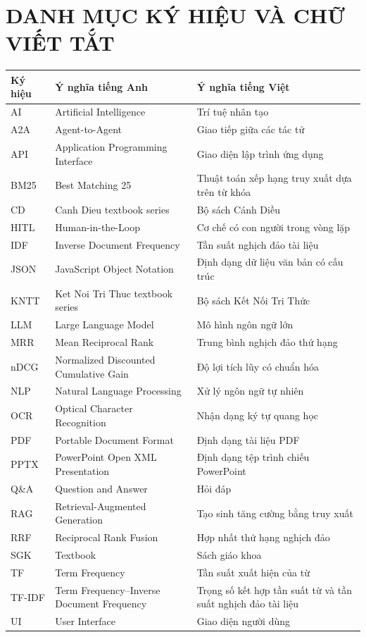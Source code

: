 \documentclass[../DoAn.tex]{subfiles}
\begin{document}
\chapter*{DANH MỤC KÝ HIỆU VÀ CHỮ VIẾT TẮT}

\begin{longtable}{p{2.7cm} p{6.1cm} p{6.2cm}}
    \hline
    \textbf{Ký hiệu} & \textbf{Ý nghĩa tiếng Anh} & \textbf{Ý nghĩa tiếng Việt} \\ \hline
    AI & Artificial Intelligence & Trí tuệ nhân tạo \\
    A2A & Agent-to-Agent & Giao tiếp giữa các tác tử \\
    API & Application Programming Interface & Giao diện lập trình ứng dụng \\
    BM25 & Best Matching 25 & Thuật toán xếp hạng truy xuất dựa trên từ khóa \\
    CD & Canh Dieu textbook series & Bộ sách Cánh Diều \\
    HITL & Human-in-the-Loop & Cơ chế có con người trong vòng lặp \\
    IDF & Inverse Document Frequency & Tần suất nghịch đảo tài liệu \\
    JSON & JavaScript Object Notation & Định dạng dữ liệu văn bản có cấu trúc \\
    KNTT & Ket Noi Tri Thuc textbook series & Bộ sách Kết Nối Tri Thức \\
    LLM & Large Language Model & Mô hình ngôn ngữ lớn \\
    MRR & Mean Reciprocal Rank & Trung bình nghịch đảo thứ hạng \\
    nDCG & Normalized Discounted Cumulative Gain & Độ lợi tích lũy có chuẩn hóa \\
    NLP & Natural Language Processing & Xử lý ngôn ngữ tự nhiên \\
    OCR & Optical Character Recognition & Nhận dạng ký tự quang học \\
    PDF & Portable Document Format & Định dạng tài liệu PDF \\
    PPTX & PowerPoint Open XML Presentation & Định dạng tệp trình chiếu PowerPoint \\
    Q\&A & Question and Answer & Hỏi đáp \\
    RAG & Retrieval-Augmented Generation & Tạo sinh tăng cường bằng truy xuất \\
    RRF & Reciprocal Rank Fusion & Hợp nhất thứ hạng nghịch đảo \\
    SGK & Textbook & Sách giáo khoa \\
    TF & Term Frequency & Tần suất xuất hiện của từ \\
    TF-IDF & Term Frequency--Inverse Document Frequency & Trọng số kết hợp tần suất từ và tần suất nghịch đảo tài liệu \\
    UI & User Interface & Giao diện người dùng \\
    \hline
\end{longtable}
\end{document}
